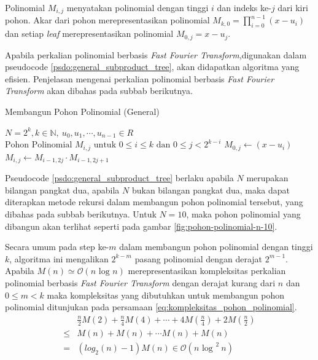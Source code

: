 Polinomial $ M_{i,j} $ menyatakan polinomial dengan tinggi $ i $ dan indeks ke-$ j $ dari kiri pohon. Akar dari pohon merepresentasikan polinomial $ M_{k,0} = \prod_{i=0}^{n-1} (x - u_i) $ dan setiap \textit{leaf} merepresentasikan polinomial $ M_{0,j} = x - u_j $.

Apabila perkalian polinomial berbasis \textit{Fast Fourier Transform},digunakan dalam pseudocode \ref{psdo:general_subproduct_tree}, akan didapatkan algoritma yang efisien. Penjelasan mengenai perkalian polinomial berbasis \textit{Fast Fourier Transform} akan dibahas pada subbab berikutnya.

\begin{algorithm}
	\caption{Membangun Pohon Polinomial (General)}
	\label{psdo:general_subproduct_tree}
	\begin{algorithmic}[1]
		\Require $ N = 2^k, k \in \mathbb{N},\ u_0, u_1, \cdots , u_{n-1} \in R $
		\Ensure $ \text{Pohon Polinomial } M_{i,j} \text{ untuk } 0 \leq i \leq k \text{ dan } 0 \leq j < 2^{k-i} $
			\State $ M_{0,j} \gets (x - u_i) $
		\EndFor
				\State $ M_{i,j} \gets M_{i-1,2j} \cdot M_{i-1,2j+1}$
			\EndFor
		\EndFor
	\end{algorithmic}
\end{algorithm}

Pseudocode \ref{psdo:general_subproduct_tree} berlaku apabila $ N $ merupakan bilangan pangkat dua, apabila $ N $ bukan bilangan pangkat dua, maka dapat diterapkan metode rekursi dalam membangun pohon polinomial tersebut, yang dibahas pada subbab berikutnya. Untuk $ N = 10 $, maka pohon polinomial yang dibangun akan terlihat seperti pada gambar \ref{fig:pohon-polinomial-n-10}.  

Secara umum pada step ke-$ m $ dalam membangun pohon polinomial dengan tinggi $ k $, algoritma ini mengalikan $ 2^{k-m} $ pasang polinomial dengan derajat $ 2^{m-1} $. Apabila $ M(n) \simeq \mathcal{O}{(n \text{ log } n)} $ merepresentasikan kompleksitas perkalian polinomial berbasis \textit{Fast Fourier Transform} dengan derajat kurang dari $ n $ dan $ 0 \leq m < k $ maka kompleksitas yang dibutuhkan untuk membangun pohon polinomial ditunjukan pada persamaan \eqref{eq:kompleksitas_pohon_polinomial}.
\begin{equation}
	\begin{aligned}
		& \frac{n}{2}M(2) + \frac{n}{4}M(4) + \cdots + 4M(\frac{n}{4}) + 2M(\frac{n}{2}) \\
		\leq & M(n) + M(n) + \cdots M(n) + M(n) \\
		= & (log_2(n) - 1)M(n) \in \mathcal{O}{(n \text{ log }^2\ n)} \\
	\end{aligned}
	\label{eq:kompleksitas_pohon_polinomial}
\end{equation}

